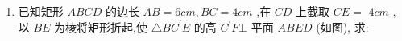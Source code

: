 \begin{enumerate}
\begin{enumerate}
        \begin{jieda}
            证明:先证 ${A}_{1}E\bot {B}_{1}E$ ,于是 ${A}_{1}E$ 是 ${AE}$ 在面 ${A}_{1}{B}_{1}{C}_{1}{D}_{1}$ 上的射影, $\therefore {AE}\bot {B}_{1}E$ . 注: ${A}_{1}E\bot {B}_{1}E$ 的证明如下: 设 ${B}_{1}E = x$ ,则 ${B}_{1}{A}_{1} = {2x}$ ,由余弦定理, $\cos \angle {A}_{1}{B}_{1}E = \dfrac{{x}^{2} + {\left( 2x\right) }^{2} - {A}_{1}{E}^{2}}{2 \cdot  x \cdot  {2x}} = {\cos }^{2}{60},\therefore {A}_{1}E = \sqrt{3}x$ ，$\therefore \angle {A}_{1}E{B}_{1} = {90}^{ \circ  }$ .
        \end{jieda}
    \end{enumerate}
    \item 已知矩形 ${ABCD}$ 的边长 ${AB} = 6{{cm}},{BC} = 4{{cm}}$ ,在 ${CD}$ 上截取 ${CE} =$  $4{{cm}}$ ,以 ${BE}$ 为棱将矩形折起,使 $\bigtriangleup B{C}^{\prime }E$ 的高 ${C}^{\prime }F \bot$ 平面 ${ABED}$ (如图), 求:
    

\end{enumerate}
